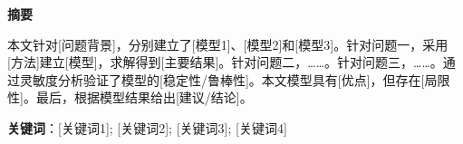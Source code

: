 
\begin{center}
\textbf{摘要}
\end{center}

本文针对[问题背景]，分别建立了[模型1]、[模型2]和[模型3]。针对问题一，采用[方法]建立[模型]，求解得到[主要结果]。针对问题二，……。针对问题三，……。通过灵敏度分析验证了模型的[稳定性/鲁棒性]。本文模型具有[优点]，但存在[局限性]。最后，根据模型结果给出[建议/结论]。

\vspace{1em}
\noindent\textbf{关键词}：[关键词1]; [关键词2]; [关键词3]; [关键词4]

\newpage
